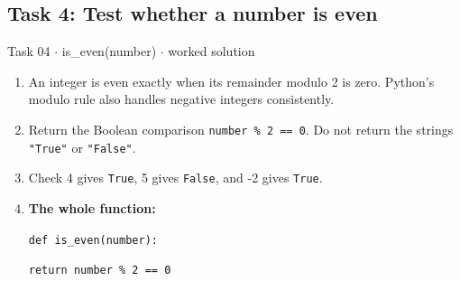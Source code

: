 \documentclass[11pt]{article}
\begin{document}
\begin{keepsection}\subsection{Task 4: Test whether a number is even}

\begin{workedbox}{Task 04 \ensuremath{\cdot} is\_even(number) \ensuremath{\cdot} worked solution}
\begin{enumerate}
\item An integer is even exactly when its remainder modulo 2 is zero. Python’s modulo rule also handles negative integers consistently.
\item Return the Boolean comparison \texttt{number \% 2 == 0}. Do not return the strings \texttt{"\texttt{True}"} or \texttt{"\texttt{False}"}.
\item Check 4 gives \texttt{True}, 5 gives \texttt{False}, and -2 gives \texttt{True}.
\item {}
\textbf{The whole function:}
\begin{tcolorbox}[colback=Paperblue,colframe=Paperblue,boxrule=0pt,arc=0pt,left=7pt,right=7pt,top=5pt,bottom=5pt]\small\sloppy
\noindent\hspace*{0em}\texttt{def is\_even(number):}\par
\noindent\hspace*{1em}\texttt{return number \% 2 == 0}\par
\end{tcolorbox}
\end{enumerate}
\end{workedbox}

\end{keepsection}
\end{document}
